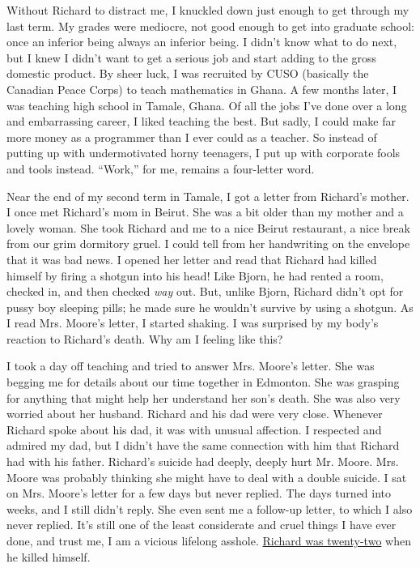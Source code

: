 Without Richard to distract me, I knuckled down just enough to get
through my last term. My grades were mediocre, not good enough to get
into graduate school: once an inferior being always an inferior being. I
didn't know what to do next, but I knew I didn't want to get a serious
job and start adding to the gross domestic product. By sheer luck, I was
recruited by CUSO (basically the Canadian Peace Corps) to teach
mathematics in Ghana. A few months later, I was teaching high school in
Tamale, Ghana. Of all the jobs I've done over a long and embarrassing
career, I liked teaching the best. But sadly, I could make far more
money as a programmer than I ever could as a teacher. So instead of
putting up with undermotivated horny teenagers, I put up with corporate
fools and tools instead. ``Work,'' for me, remains a four-letter word.

Near the end of my second term in Tamale, I got a letter from Richard's
mother. I once met Richard's mom in Beirut. She was a bit older than my
mother and a lovely woman. She took Richard and me to a nice Beirut
restaurant, a nice break from our grim dormitory gruel. I could tell
from her handwriting on the envelope that it was bad news. I opened her
letter and read that Richard had killed himself by firing a shotgun into
his head! Like Bjorn, he had rented a room, checked in, and then checked
\emph{way} out. But, unlike Bjorn, Richard didn't opt for pussy boy
sleeping pills; he made sure he wouldn't survive by using a shotgun. As
I read Mrs. Moore's letter, I started shaking. I was surprised by my
body's reaction to Richard's death. Why am I feeling like this?

I took a day off teaching and tried to answer Mrs. Moore's letter. She
was begging me for details about our time together in Edmonton. She was
grasping for anything that might help her understand her son's death.
She was also very worried about her husband. Richard and his dad were
very close. Whenever Richard spoke about his dad, it was with unusual
affection. I respected and admired my dad, but I didn't have the same
connection with him that Richard had with his father. Richard's suicide
had deeply, deeply hurt Mr. Moore. Mrs. Moore was probably thinking she
might have to deal with a double suicide. I sat on Mrs. Moore's letter
for a few days but never replied. The days turned into weeks, and I
still didn't reply. She even sent me a follow-up letter, to which I also
never replied. It's still one of the least considerate and cruel things
I have ever done, and trust me, I am a vicious lifelong asshole.
\href{https://www.findagrave.com/memorial/162651768/richard_william-moore}{Richard
was twenty-two} when he killed himself.


